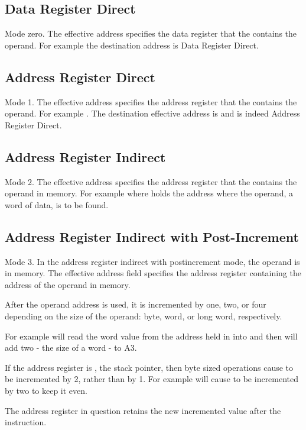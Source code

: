 \subsection{Data Register Direct}
Mode zero. The effective address specifies the data register that the contains the operand. For example  the destination address is Data Register Direct.

\subsection{Address Register Direct}
Mode 1. The effective address specifies the address register that the contains the operand. For example . The destination effective address is  and is indeed Address Register Direct.

\subsection{Address Register Indirect}
Mode 2. The effective address specifies the address register that the contains the operand in memory. For example  where  holds the address where the operand, a word of data, is to be found.

\subsection{Address Register Indirect with Post-Increment}
Mode 3. In the address register indirect with postincrement mode, the operand is in memory. The effective address field specifies the address register containing the address of the operand in memory. 

After the operand address is used, it is incremented by one, two, or four
depending on the size of the operand: byte, word, or long word, respectively. 

For example  will read the word value from the address held in  into  and then will add two - the size of a word - to A3.

If the address register is , the stack pointer, then byte sized operations cause  to be incremented by 2, rather than by 1. For example  will cause  to be incremented by two to keep it even.

The address register in question retains the new incremented value after the instruction.

